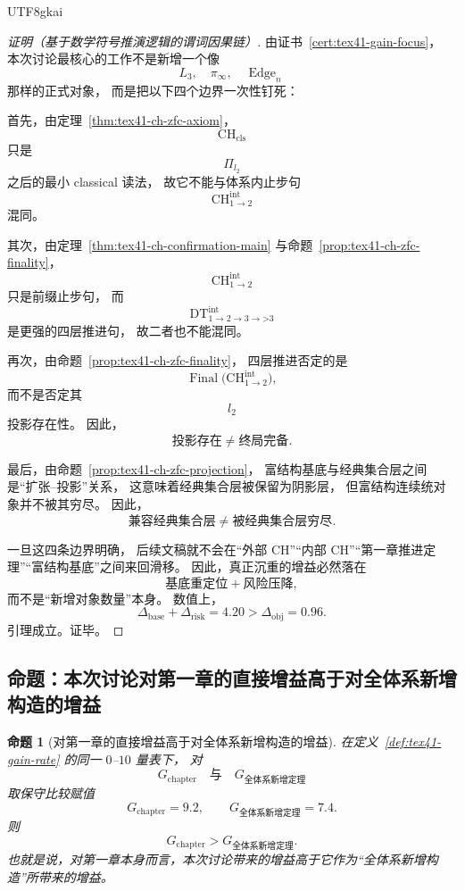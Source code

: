 \documentclass[12pt]{article}
\newtheorem{proposition}{命题}[section]
\newcommand{\Edge}{\operatorname{Edge}}
\newcommand{\ProjLtwo}{\Pi_{l_2}}
\newcommand{\Final}{\operatorname{Final}}
\begin{document}
\begin{CJK*}{UTF8}{gkai}
\begin{proof}[证明（基于数学符号推演逻辑的谓词因果链）]
由证书~\ref{cert:tex41-gain-focus}，
本次讨论最核心的工作不是新增一个像
\[
  L_3,\quad \pi_\infty,\quad \Edge_n
\]
那样的正式对象，
而是把以下四个边界一次性钉死：

首先，由定理~\ref{thm:tex41-ch-zfc-axiom}，
\[
  \mathrm{CH}_{\mathrm{cls}}
\]
只是
\[
  \ProjLtwo
\]
之后的最小 classical 读法，
故它不能与体系内止步句
\[
  \mathrm{CH}^{\mathrm{int}}_{1\to2}
\]
混同。

其次，由定理~\ref{thm:tex41-ch-confirmation-main} 与命题~\ref{prop:tex41-ch-zfc-finality}，
\[
  \mathrm{CH}^{\mathrm{int}}_{1\to2}
\]
只是前缀止步句，
而
\[
  \mathrm{DT}^{\mathrm{int}}_{1\to2\to3\to\text{>3}}
\]
是更强的四层推进句，
故二者也不能混同。

再次，由命题~\ref{prop:tex41-ch-zfc-finality}，
四层推进否定的是
\[
  \Final\!\bigl(\mathrm{CH}^{\mathrm{int}}_{1\to2}\bigr),
\]
而不是否定其
\[
  l_2
\]
投影存在性。
因此，
\[
  \text{投影存在}
  \neq
  \text{终局完备}.
\]

最后，由命题~\ref{prop:tex41-ch-zfc-projection}，
富结构基底与经典集合层之间是“扩张--投影”关系，
这意味着经典集合层被保留为阴影层，
但富结构连续统对象并不被其穷尽。
因此，
\[
  \text{兼容经典集合层}
  \neq
  \text{被经典集合层穷尽}.
\]

一旦这四条边界明确，
后续文稿就不会在“外部 CH”“内部 CH”“第一章推进定理”“富结构基底”之间来回滑移。
因此，真正沉重的增益必然落在
\[
  \text{基底重定位}
  +
  \text{风险压降},
\]
而不是“新增对象数量”本身。
数值上，
\[
  \Delta_{\mathrm{base}}+\Delta_{\mathrm{risk}}=4.20>\Delta_{\mathrm{obj}}=0.96.
\]
引理成立。证毕。
\end{proof}

\subsection{命题：本次讨论对第一章的直接增益高于对全体系新增构造的增益}
\label{subsec:tex41-ch2-proposition}

\begin{proposition}[对第一章的直接增益高于对全体系新增构造的增益]
\label{prop:tex41-gain-internal}
在定义~\ref{def:tex41-gain-rate} 的同一 $0$--$10$ 量表下，
对
\[
  G_{\mathrm{chapter}}
  \quad\text{与}\quad
  G_{\text{全体系新增定理}}
\]
取保守比较赋值
\[
  G_{\mathrm{chapter}}=9.2,
  \qquad
  G_{\text{全体系新增定理}}=7.4.
\]
则
\[
  G_{\mathrm{chapter}}
  >
  G_{\text{全体系新增定理}}.
\]
也就是说，对第一章本身而言，本次讨论带来的增益高于它作为“全体系新增构造”所带来的增益。
\end{proposition}


\end{CJK*}
\end{document}

